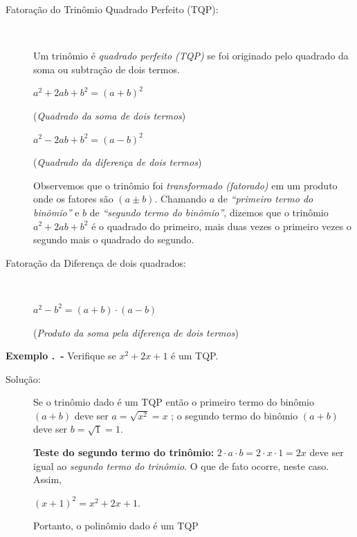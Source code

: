 \begin{description}
\item [Fatoração do Trinômio Quadrado Perfeito (TQP):]~

Um trinômio é \textit{quadrado perfeito (TQP)} se foi originado pelo quadrado da soma ou subtração de dois termos.

\begin{multicols}{2}
$a^2 + 2ab + b^2 = (a + b)^2$

(\textit{Quadrado da soma de dois termos})
\end{multicols}

\begin{multicols}{2}
$a^2 - 2ab + b^2 = (a - b)^2$

(\textit{Quadrado da diferença de dois termos})
\end{multicols}

Observemos que o trinômio foi \textit{transformado (fatorado)} em um produto onde os fatores são $(a \pm b)$. Chamando $a$ de \textit{“primeiro termo do binômio”} e $b$ de \textit{“segundo termo do binômio”}, dizemos que o trinômio $a^2 + 2ab + b^2$ é o quadrado do primeiro, mais duas vezes o primeiro vezes o segundo mais o quadrado do segundo.

\end{description}

\begin{description}
\item [Fatoração da Diferença de dois quadrados:]~

\begin{multicols}{2}
$a^2 - b^2 = (a+b) \cdot (a - b)$

(\textit{Produto da soma pela diferença de dois termos})
\end{multicols}
\end{description}

\noindent\textbf{Exemplo \thesubsection.\theexemplo~-} Verifique se $x^2 + 2x + 1$ é um TQP.

\begin{description}
\item [Solução:] Se o trinômio dado é um TQP então o primeiro termo do binômio $(a+b)$ deve ser $a = \sqrt{x^2} = x$  ; o segundo termo do binômio $(a+b)$ deve ser $b = \sqrt{1} = 1$.

\textbf{Teste do segundo termo do trinômio:}  $2 \cdot a \cdot b = 2 \cdot x \cdot 1 = 2x$  deve ser igual ao \textit{segundo termo do trinômio}. O que de fato ocorre, neste caso. Assim,

\begin{center} $(x + 1)^2 = x^2 + 2x + 1$. \end{center}

Portanto, o polinômio dado é um TQP \qedsymbol{}

\end{description}

